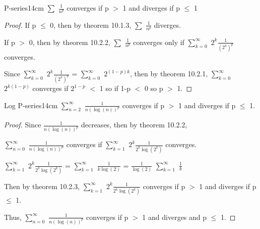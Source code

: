     \vspace{0.5cm}



    \begin{wtheorem}{P-series}{14cm}
        $\sum$ $\frac{1}{n^p}$ converges if p $>$ 1 and diverges if p $\leq$ 1
    \end{wtheorem}

    \begin{proof}
        If p $\leq$ 0, then by {\color{red} theorem 10.1.3},
        $\sum$ $\frac{1}{n^p}$ diverges.

        If p $>$ 0, then by {\color{red} theorem 10.2.2},
        $\sum$ $\frac{1}{n^p}$ converges only if
        $\sum_{k=0}^{\infty}$ $2^k \frac{1}{(2^k)^p}$ converges.

        Since $\sum_{k=0}^{\infty}$ $2^k \frac{1}{(2^k)^p}$
        = $\sum_{k=0}^{\infty}$ $2^{(1-p)k}$, then by {\color{red} theorem 10.2.1},
        $\sum_{k=0}^{\infty}$ $2^{k(1-p)}$ converges if
        $2^{1-p}$ $<$ 1 so if 1-p $<$ 0 so p $>$ 1.
    \end{proof}

    \newpage



    \begin{wtheorem}{Log P-series}{14cm}
        $\sum_{n = 2}^{\infty}$ $\frac{1}{n(\log(n))^p}$
        converges if p $>$ 1 and diverges if p $\leq$ 1.        
    \end{wtheorem}
    
    \begin{proof}
        Since $\frac{1}{n(\log(n))^p}$ decreases, then by
        {\color{red} theorem 10.2.2},

        $\sum_{n=0}^{\infty}$ $\frac{1}{n(\log(n))^p}$ converges if
        $\sum_{k=1}^{\infty}$ $2^k \frac{1}{2^k \log(2^k)}$ converges.
        
        \hspace{1cm}
        $\sum_{k=1}^{\infty}$ $2^k \frac{1}{2^k \log(2^k)}$
        = $\sum_{k=1}^{\infty}$ $\frac{1}{ k \log(2)}$
        = $\frac{1}{\log(2)}$ $\sum_{k=1}^{\infty}$ $\frac{1}{k}$

        Then by {\color{red} theorem 10.2.3},
        $\sum_{k=1}^{\infty}$ $2^k \frac{1}{2^k \log(2^k)}$ converges if
        p $>$ 1 and diverges if p $\leq$ 1.

        Thus, $\sum_{n=0}^{\infty}$ $\frac{1}{n(\log(n))^p}$ converges if
        p $>$ 1 and diverges and p $\leq$ 1.
    \end{proof}

